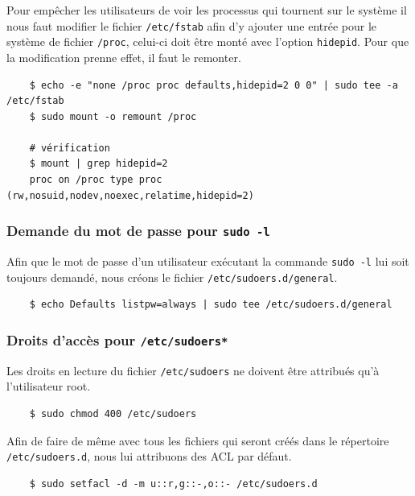 \documentclass{extarticle} %
\begin{document}
    Pour empêcher les utilisateurs de voir les processus qui tournent sur le système il nous faut modifier
    le fichier \texttt{/etc/fstab} afin d'y ajouter une entrée pour le système de fichier \texttt{/proc},
    celui-ci doit être monté avec l'option \texttt{hidepid}. Pour que la modification prenne effet, il faut le remonter.

    \pagebreak
    \begin{verbatim}
    $ echo -e "none /proc proc defaults,hidepid=2 0 0" | sudo tee -a /etc/fstab
    $ sudo mount -o remount /proc

    # vérification
    $ mount | grep hidepid=2
    proc on /proc type proc (rw,nosuid,nodev,noexec,relatime,hidepid=2)
    \end{verbatim}

    \subsubsection{Demande du mot de passe pour \texttt{sudo -l}}

    Afin que le mot de passe d'un utilisateur exécutant la commande \texttt{sudo -l} lui soit toujours demandé, nous créons le fichier \texttt{/etc/sudoers.d/general}.

    \begin{verbatim}
    $ echo Defaults listpw=always | sudo tee /etc/sudoers.d/general
    \end{verbatim}

    \subsubsection{Droits d'accès pour \texttt{/etc/sudoers*}}

    Les droits en lecture du fichier \texttt{/etc/sudoers} ne doivent être attribués qu'à l'utilisateur root.

    \begin{verbatim}
    $ sudo chmod 400 /etc/sudoers
    \end{verbatim}

    Afin de faire de même avec tous les fichiers qui seront créés dans le répertoire \texttt{/etc/sudoers.d}, nous lui attribuons des ACL par défaut.

    \begin{verbatim}
    $ sudo setfacl -d -m u::r,g::-,o::- /etc/sudoers.d
    \end{verbatim}
\end{document}
